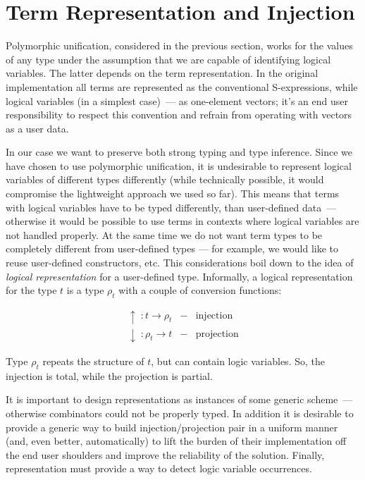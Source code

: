 \section{Term Representation and Injection}
\label{sec:injection}

Polymorphic unification, considered in the previous section, works for the values of any type under the assumption that we
are capable of identifying logical variables. The latter depends on the term representation. In the original
implementation all terms are represented as the conventional S-expressions, while logical variables (in a simplest case)~--- as one-element vectors; it's an end user responsibility to respect this convention and refrain from operating 
with vectors as a user data.

In our case we want to preserve both strong typing and type inference. Since we have chosen to use polymorphic 
unification, it is undesirable to represent logical variables of different types differently (while technically 
possible, it would compromise the lightweight approach we used so far). This means that terms with logical
variables have to be typed differently, than user-defined data~--- otherwise it would be possible to use
terms in contexts where logical variables are not handled properly. At the same time we do not want term types
to be completely different from user-defined types --- for example, we would like to reuse user-defined constructors, etc.
This considerations boil down to the idea of \emph{logical representation} for a user-defined type. Informally, 
a logical representation for the type $t$ is a type $\rho_t$ with a couple of conversion functions:


$$
\begin{array}{rcl}
   \uparrow  \;: t \to \rho_t & - & \mbox{injection}\\
   \downarrow\;: \rho_t \to t & - & \mbox{projection}
\end{array}
$$

Type $\rho_t$ repeats the structure of $t$, but can contain logic variables. So, the injection is total, 
while the projection is partial. 

It is important to design representations as instances of some generic scheme~--- otherwise \miniKanren combinators
could not be properly typed. In addition it is desirable to provide a generic way to build
injection/projection pair in a uniform manner (and, even better, automatically) to lift the burden of
their implementation off the end user shoulders and improve the reliability of the solution. Finally,
representation must provide a way to detect logic variable occurrences. 


